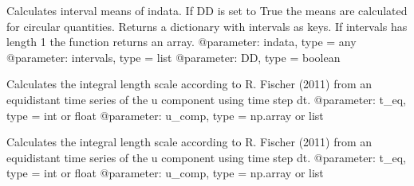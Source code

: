 \documentclass[letterpaper,10pt,english]{sphinxmanual}
\begin{document}

\begin{fulllineitems}
\label{\detokenize{index:windtunnel.calc_intervalmean}}
Calculates interval means of indata. If DD is set to True the means are 
calculated for circular quantities. Returns a dictionary with 
intervals as keys. If intervals has length 1 the function returns an array.
@parameter: indata, type = any
@parameter: intervals, type = list
@parameter: DD, type = boolean

\end{fulllineitems}


\begin{fulllineitems}
\label{\detokenize{index:windtunnel.calc_lux_data}}
Calculates the integral length scale according to R. Fischer (2011) 
from an equidistant time series of the u component using time step dt.
@parameter: t\_eq, type = int or float
@parameter: u\_comp, type = np.array or list

\end{fulllineitems}


\begin{fulllineitems}
\label{\detokenize{index:windtunnel.calc_lux_data_wght}}
Calculates the integral length scale according to R. Fischer (2011) 
from an equidistant time series of the u component using time step dt.
@parameter: t\_eq, type = int or float
@parameter: u\_comp, type = np.array or list

\end{fulllineitems}

\end{document}
